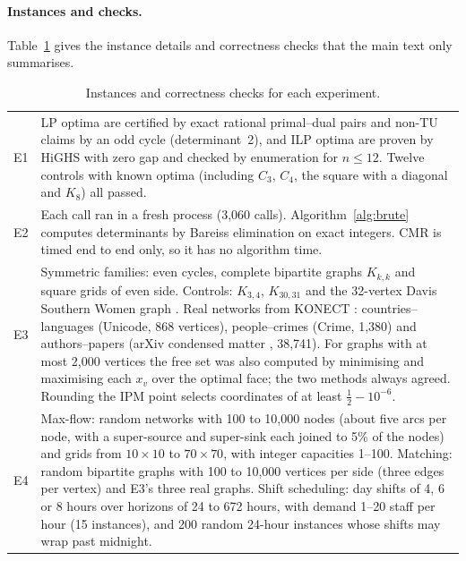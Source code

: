 \paragraph{Instances and checks.} Table~\ref{tab:instances} gives the instance details and correctness checks that the main text only summarises.

\begin{table}[H]
  \centering\small
  \caption{Instances and correctness checks for each experiment.}
  \label{tab:instances}
  \begin{tabular}{@{}lp{}@{}}
    \toprule
    E1 & LP optima are certified by exact rational primal--dual pairs and non-TU claims by an odd cycle (determinant~2), and ILP optima are proven by HiGHS with zero gap and checked by enumeration for $n\le 12$. Twelve controls with known optima (including $C_3$, $C_4$, the square with a diagonal and $K_8$) all passed. \\
    E2 & Each call ran in a fresh process (3,060 calls). Algorithm~\ref{alg:brute} computes determinants by Bareiss elimination on exact integers. CMR is timed end to end only, so it has no algorithm time. \\
    E3 & Symmetric families: even cycles, complete bipartite graphs $K_{k,k}$ and square grids of even side. Controls: $K_{3,4}$, $K_{30,31}$ and the 32-vertex Davis Southern Women graph \cite{davis1941}. Real networks from KONECT \cite{kunegis2013}: countries--languages (Unicode, 868 vertices), people--crimes (Crime, 1,380) and authors--papers (arXiv condensed matter \cite{newman2001}, 38,741). For graphs with at most 2,000 vertices the free set was also computed by minimising and maximising each $x_v$ over the optimal face; the two methods always agreed. Rounding the IPM point selects coordinates of at least $\tfrac12-10^{-6}$. \\
    E4 & Max-flow: random networks with 100 to 10,000 nodes (about five arcs per node, with a super-source and super-sink each joined to 5\% of the nodes) and grids from $10\times10$ to $70\times70$, with integer capacities 1--100. Matching: random bipartite graphs with 100 to 10,000 vertices per side (three edges per vertex) and E3's three real graphs. Shift scheduling: day shifts of 4, 6 or 8 hours over horizons of 24 to 672 hours, with demand 1--20 staff per hour (15 instances), and 200 random 24-hour instances whose shifts may wrap past midnight. \\
    \bottomrule
  \end{tabular}
\end{table}

